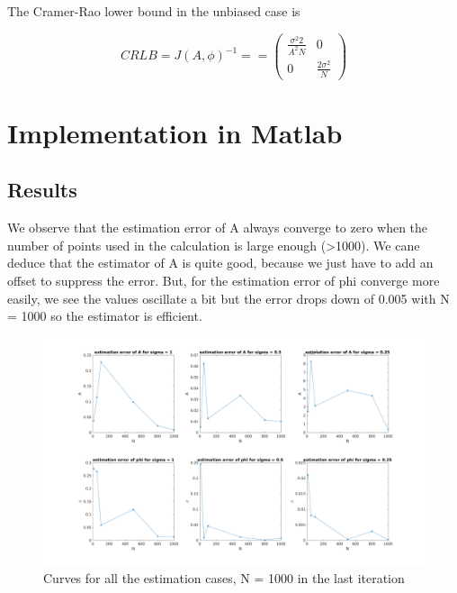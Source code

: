 \documentclass{report}
\begin{document}
The Cramer-Rao lower bound in the unbiased case is 

\begin{equation}
CRLB = J(A,\phi)^{-1} = =\begin{pmatrix}
\frac{\sigma^2 2}{A^2N} & 0 \\ 
0 & \frac{2\sigma^2}{N}
\end{pmatrix} 
\end{equation}




























\chapter{Implementation in Matlab }




\section{Results}

We observe that the estimation error of A always converge to zero when the 
number of points used in the calculation is large enough (>1000). We cane deduce 
that the estimator of A is quite good, because we just have to add an offset to 
suppress the error.
But, for the estimation error of phi converge more easily, we see the values oscillate 
a bit but the error drops down of 0.005 with N = 1000 so the estimator is efficient.


\begin{figure}[h]
	\centering
	\includegraphics[width=\linewidth]{../1000_2}
	\caption{Curves for all the estimation cases, N = 1000 in the last iteration}
	\label{fig:10002}
\end{figure}
\end{document}
